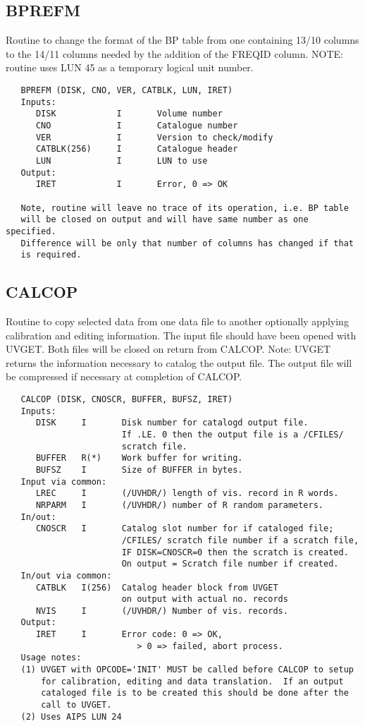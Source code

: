 \subsection{BPREFM}
Routine to change the format of the BP table from one containing
13/10 columns to the 14/11 columns needed by the addition of the
FREQID column.
NOTE: routine uses LUN 45 as a temporary logical unit number.
\begin{verbatim}
   BPREFM (DISK, CNO, VER, CATBLK, LUN, IRET)
   Inputs:
      DISK            I       Volume number
      CNO             I       Catalogue number
      VER             I       Version to check/modify
      CATBLK(256)     I       Catalogue header
      LUN             I       LUN to use
   Output:
      IRET            I       Error, 0 => OK

   Note, routine will leave no trace of its operation, i.e. BP table
   will be closed on output and will have same number as one specified.
   Difference will be only that number of columns has changed if that
   is required.
\end{verbatim}

\subsection{CALCOP}
Routine to copy selected data from one data file to another
optionally applying calibration and editing information.  The input
file should have been opened with UVGET.  Both files will be closed
on return from CALCOP.
  Note: UVGET returns the information necessary to catalog the
output file.  The output file will be compressed if necessary at
completion of CALCOP.
\begin{verbatim}
   CALCOP (DISK, CNOSCR, BUFFER, BUFSZ, IRET)
   Inputs:
      DISK     I       Disk number for catalogd output file.
                       If .LE. 0 then the output file is a /CFILES/
                       scratch file.
      BUFFER   R(*)    Work buffer for writing.
      BUFSZ    I       Size of BUFFER in bytes.
   Input via common:
      LREC     I       (/UVHDR/) length of vis. record in R words.
      NRPARM   I       (/UVHDR/) number of R random parameters.
   In/out:
      CNOSCR   I       Catalog slot number for if cataloged file;
                       /CFILES/ scratch file number if a scratch file,
                       IF DISK=CNOSCR=0 then the scratch is created.
                       On output = Scratch file number if created.
   In/out via common:
      CATBLK   I(256)  Catalog header block from UVGET
                       on output with actual no. records
      NVIS     I       (/UVHDR/) Number of vis. records.
   Output:
      IRET     I       Error code: 0 => OK,
                          > 0 => failed, abort process.
   Usage notes:
   (1) UVGET with OPCODE='INIT' MUST be called before CALCOP to setup
       for calibration, editing and data translation.  If an output
       cataloged file is to be created this should be done after the
       call to UVGET.
   (2) Uses AIPS LUN 24
\end{verbatim}

